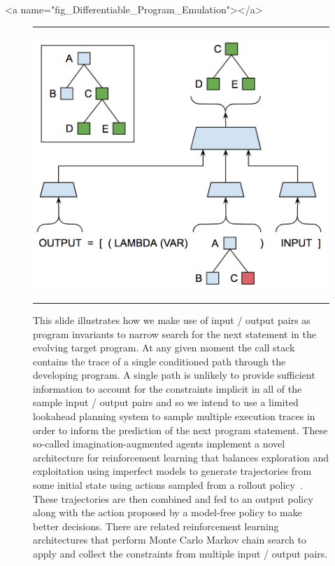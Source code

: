 \rawhtml
<a name="fig_Differentiable_Program_Emulation"></a>
\endrawhtml
\begin{figure}
%
  \hrule{}
%
  \begin{center} 
    \includegraphics[width=325pt]{./figures/Differentiable_Program_Emulation.png} %
  \end{center}
%
  \caption{This slide illustrates how we make use of input / output pairs as program invariants to narrow search for the next statement in the evolving target program. At any given moment the call stack contains the trace of a single conditioned path through the developing program. A single path is unlikely to provide sufficient information to account for the constraints implicit in all of the sample input / output pairs and so we intend to use a limited lookahead planning system to sample multiple execution traces in order to inform the prediction of the next program statement. 
%
These so-called imagination-augmented agents implement a novel architecture for reinforcement learning that balances exploration and exploitation using imperfect models to generate trajectories from some initial state using actions sampled from a rollout policy~\cite{PascanuetalCoRR-17,WeberetalCoRR-17,HamricketalCoRR-17,GuezetalCoRR-18}. These trajectories are then combined and fed to an output policy along with the action proposed by a model-free policy to make better decisions. There are related reinforcement learning architectures that perform Monte Carlo Markov chain search to apply and collect the constraints from multiple input / output pairs.}
%
  \hrule{}
%
\end{figure}

